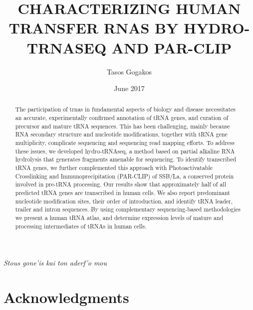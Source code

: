 \documentclass[12pt]{rockefeller}
\newcommand{\textgreek}[1]{\begingroup\fontencoding{LGR}\selectfont#1\endgroup} %
\begin{document}
\author{Tasos Gogakos}
\title{\MakeUppercase{Characterizing human transfer rnas by hydro-trnaseq and par-clip}}
\date{June 2017}

\maketitle

\thispagestyle{empty}
\makecopyright


\begin{abstract}

The participation of \glspl{trna} in fundamental aspects of biology and disease necessitates an accurate, experimentally confirmed annotation of tRNA genes, and curation of precursor and mature tRNA sequences. This has been challenging, mainly because RNA secondary structure and nucleotide modifications, together with tRNA gene multiplicity, complicate sequencing and sequencing read mapping efforts. To address these issues, we developed hydro-tRNAseq, a method based on partial alkaline RNA hydrolysis that generates fragments amenable for sequencing. To identify transcribed tRNA genes, we further complemented this approach with Photoactivatable Crosslinking and Immunoprecipitation (PAR-CLIP) of SSB/La, a conserved protein involved in pre-tRNA processing. Our results show that approximately half of all predicted tRNA genes are transcribed in human cells. We also report predominant nucleotide modification sites, their order of introduction, and identify tRNA leader, trailer and intron sequences. By using complementary sequencing-based methodologies we present a human tRNA atlas, and determine expression levels of mature and processing intermediates of tRNAs in human cells.
\end{abstract}


\chapter*{} %
\addtocounter{page}{2} %
\vspace{3in} %
\begin{flushright} %
\emph{\textgreek{Stous gone'is kai ton aderf'o mou}}
\end{flushright}

\chapter*{Acknowledgments} %
\end{document}
